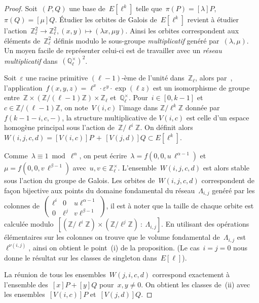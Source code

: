 \documentclass[10pt,a4paper]{book}
\theoremstyle{plain}
\theoremstyle{definition}
\theoremstyle{definition}
\theoremstyle{definition}
\theoremstyle{definition}
\theoremstyle{remark}
\theoremstyle{remark}
\theoremstyle{definition}
\begin{document}
\begin{proof}
Soit~$(P, Q)$ une base de~$E[\ell^k]$ telle que~$\pi(P)=[\lambda] P$, $\pi(Q)=[\mu] Q$.
\'Etudier les orbites de Galois de~$E[\ell^k]$
revient à étudier l'action~$\mathbb{Z}_\ell^2 \rightarrow \mathbb{Z}_\ell^2, (x, y) \mapsto (\lambda x, \mu y)$.
Ainsi les orbites correspondent aux éléments de~$\mathbb{Z}_\ell^2$ définis
modulo le sous-groupe \emph{multiplicatif} genéré par~$(\lambda, \mu)$.
Un moyen facile de représenter celui-ci est de travailler 
avec un \emph{réseau multiplicatif} dans~$(\mathbb{Q}_{\ell}^{\times})^2$.

Soit~$\varepsilon$ une racine primitive $(\ell-1)$-ème de l'unité dans~$\mathbb{Z}_{\ell}$,
alors par~\cite[Théorème II.3.2]{Serre70},
l'application~$f(x, y, z) = \ell^x \cdot \varepsilon^y \cdot \exp (\ell z)$
est un isomorphisme de groupe entre~$\mathbb{Z} \times (\mathbb{Z}/(\ell-1) \mathbb{Z}) \times \mathbb{Z}_{\ell}$ et~$\mathbb{Q}_{\ell}^{\times}$.
Pour~$i \in [0,k-1 ]$ et~$c \in \mathbb{Z}/(\ell-1)\mathbb{Z}$,
on note~$V(i,c)$ l'image dans $\mathbb{Z}/\ell^k \mathbb{Z}$ donnée par~$f(k-1-i,c,- )$, la structure multiplicative de $V(i, c)$
est celle d'un espace homogène principal sous l'action de~$\mathbb{Z}/\ell^i \mathbb{Z}$.
On définit alors~$W(i,j,c,d) = [V(i, c)] P \,+\, [V(j, d)]  Q \subset E[\ell^k]$.

Comme~$\lambda \equiv 1 \bmod \ell^{\alpha}$, on peut écrire~$\lambda = f(0,0,u\, \ell^{\alpha-1})$
et~$\mu = f(0,0, v\, \ell^{\beta-1})$
avec~$u, v \in \mathbb{Z}_{\ell}^{\times}$.
L'ensemble~$W(i,j,c,d)$ est alors stable sous l'action du groupe de Galois.
Les orbites de~$W(i,j,c,d)$ correspondent de façon bijective
aux points du domaine fondamental du réseau~$\Lambda_{i,j}$ genéré par
les colonnes de~$\left(  \begin{smallmatrix}
\ell^i & 0 & u \ell^{\alpha-1}\\ 
0 & \ell^j & v \ell^{\beta-1}
\end{smallmatrix} \right) $,
il est à noter que la taille de chaque orbite est calculée modulo~$[(\mathbb{Z}/\ell^i \mathbb{Z}) \times (\mathbb{Z}/\ell^j \mathbb{Z})\::\: \Lambda_{i,j}]$.
En utilisant des opérations élémentaires sur les colonnes 
on trouve que  le volume fondamental de~$\Lambda_{i,j}$ est~$\ell^{\nu(i,j)}$,
ainsi on obtient le point~(i) de la proposition.
(Le cas~$i = j = 0$ nous donne le résultat sur les classes de singleton dans~$E[\ell]$).

La réunion de tous les ensembles~$W(j,i,c,d)$
correspond exactement à l'ensemble des~$[x] P + [y] Q$ pour~$x, y \neq 0$.
On obtient les classes de~(ii) avec
les ensembles~$[V(i, c)] P$ et~$[V(j,d)] Q$.
\end{proof}
\end{document}

